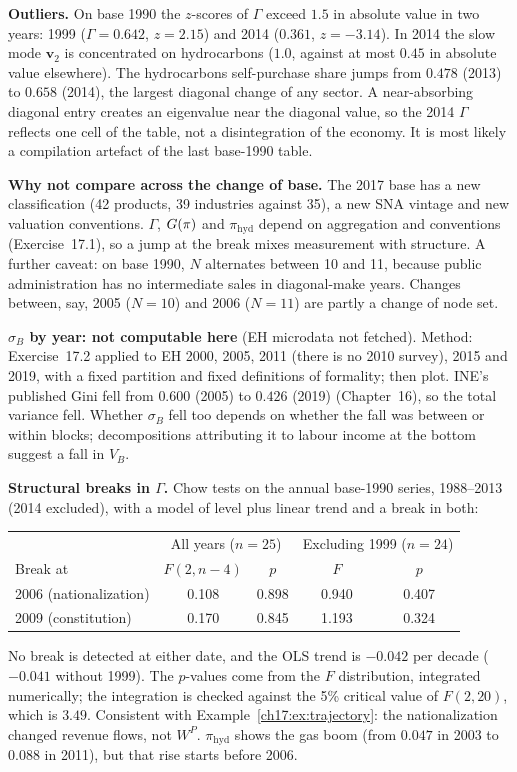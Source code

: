\documentclass[../solutions_manual.tex]{subfiles}
\begin{document}
\textbf{Outliers.} On base 1990 the $z$-scores of $\Gamma$ exceed $1.5$ in absolute value in two years: 1999 ($\Gamma = 0.642$, $z = 2.15$) and 2014 ($0.361$, $z = -3.14$). In 2014 the slow mode $\mathbf{v}_2$ is concentrated on hydrocarbons ($1.0$, against at most $0.45$ in absolute value elsewhere). The hydrocarbons self-purchase share jumps from $0.478$ (2013) to $0.658$ (2014), the largest diagonal change of any sector. A near-absorbing diagonal entry creates an eigenvalue near the diagonal value, so the 2014 $\Gamma$ reflects one cell of the table, not a disintegration of the economy. It is most likely a compilation artefact of the last base-1990 table.

\textbf{Why not compare across the change of base.} The 2017 base has a new classification (42 products, 39 industries against 35), a new SNA vintage and new valuation conventions. $\Gamma$, $G(\pi)$ and $\pi_{\text{hyd}}$ depend on aggregation and conventions (Exercise~17.1), so a jump at the break mixes measurement with structure. A further caveat: on base 1990, $N$ alternates between 10 and 11, because public administration has no intermediate sales in diagonal-make years. Changes between, say, 2005 ($N = 10$) and 2006 ($N = 11$) are partly a change of node set.

 \textbf{$\sigma_B$ by year: not computable here} (EH microdata not fetched). Method: Exercise~17.2 applied to EH 2000, 2005, 2011 (there is no 2010 survey), 2015 and 2019, with a fixed partition and fixed definitions of formality; then plot. INE's published Gini fell from $0.600$ (2005) to $0.426$ (2019) (Chapter~16), so the total variance fell. Whether $\sigma_B$ fell too depends on whether the fall was between or within blocks; decompositions attributing it to labour income at the bottom \citep{vargas2015explaining} suggest a fall in $V_B$.

 \textbf{Structural breaks in $\Gamma$.} Chow tests on the annual base-1990 series, 1988--2013 (2014 excluded), with a model of level plus linear trend and a break in both:
\begin{center}
\begin{tabular}{lcccc}
\toprule
& \multicolumn{2}{c}{All years ($n = 25$)} & \multicolumn{2}{c}{Excluding 1999 ($n = 24$)} \\
Break at & $F(2, n-4)$ & $p$ & $F$ & $p$ \\
\midrule
2006 (nationalization) & 0.108 & 0.898 & 0.940 & 0.407 \\
2009 (constitution) & 0.170 & 0.845 & 1.193 & 0.324 \\
\bottomrule
\end{tabular}
\end{center}
No break is detected at either date, and the OLS trend is $-0.042$ per decade ($-0.041$ without 1999). The $p$-values come from the $F$ distribution, integrated numerically; the integration is checked against the 5\% critical value of $F(2,20)$, which is $3.49$. Consistent with Example~\ref{ch17:ex:trajectory}: the nationalization changed revenue flows, not $W^P$. $\pi_{\text{hyd}}$ shows the gas boom (from $0.047$ in 2003 to $0.088$ in 2011), but that rise starts before 2006.
\end{document}
